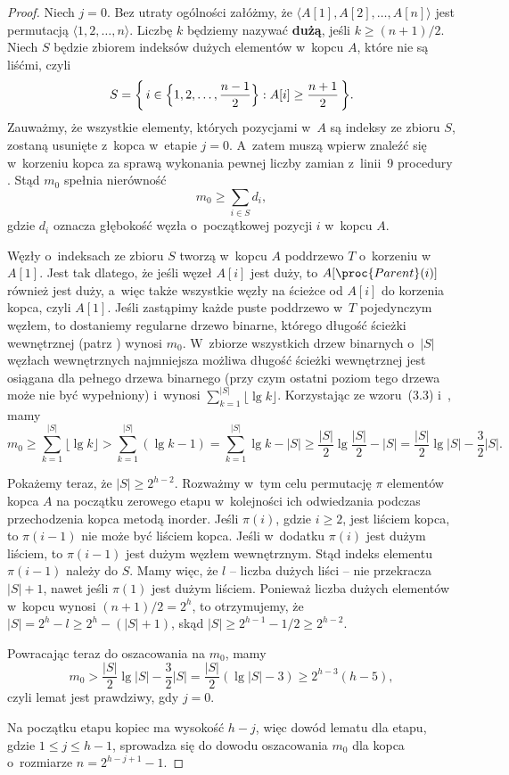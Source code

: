 \begin{proof}
Niech $j=0$. Bez utraty ogólności załóżmy, że $\langle A[1],A[2],\dots,A[n]\rangle$ jest permutacją $\langle1,2,\dots,n\rangle$. Liczbę $k$ będziemy nazywać \textbf{dużą}, jeśli $k\ge(n+1)/2$. Niech $S$ będzie zbiorem indeksów dużych elementów w~kopcu $A$, które nie są liśćmi, czyli
\[
    S = \biggl\{\,i\in\Bigl\{1,2,\dots,\frac{n-1}{2}\Bigr\}:A[i]\ge\frac{n+1}{2}\,\biggr\}.
\]
Zauważmy, że wszystkie elementy, których pozycjami w~$A$ są indeksy ze zbioru $S$, zostaną usunięte z~kopca w~etapie $j=0$. A~zatem muszą wpierw znaleźć się w~korzeniu kopca za sprawą wykonania pewnej liczby zamian z~linii~9 procedury . Stąd $m_0$ spełnia nierówność
\[
    m_0 \ge \sum_{i\in S}d_i,
\]
gdzie $d_i$ oznacza głębokość węzła o~początkowej pozycji $i$ w~kopcu $A$.

Węzły o~indeksach ze zbioru $S$ tworzą w~kopcu $A$ poddrzewo $T$ o~korzeniu w~$A[1]$. Jest tak dlatego, że jeśli węzeł $A[i]$ jest duży, to $A[\proc{Parent}(i)]$ również jest duży, a~więc także wszystkie węzły na ścieżce od $A[i]$ do korzenia kopca, czyli $A[1]$. Jeśli zastąpimy każde puste poddrzewo w~$T$ pojedynczym węzłem, to dostaniemy regularne drzewo binarne, którego długość ścieżki wewnętrznej (patrz ) wynosi $m_0$. W~zbiorze wszystkich drzew binarnych o~$|S|$ węzłach wewnętrznych najmniejsza możliwa długość ścieżki wewnętrznej jest osiągana dla pełnego drzewa binarnego (przy czym ostatni poziom tego drzewa może nie być wypełniony) i~wynosi $\sum_{k=1}^{|S|}\lfloor\lg k\rfloor$. Korzystając ze wzoru~(3.3) i~, mamy
\[
    m_0 \ge \sum_{k=1}^{|S|}\lfloor\lg k\rfloor > \sum_{k=1}^{|S|}(\lg k-1) = \sum_{k=1}^{|S|}\lg k-|S| \ge \frac{|S|}{2}\lg\frac{|S|}{2}-|S| = \frac{|S|}{2}\lg|S|-\frac{3}{2}|S|.
\]

Pokażemy teraz, że $|S|\ge2^{h-2}$. Rozważmy w~tym celu permutację $\pi$ elementów kopca $A$ na początku zerowego etapu w~kolejności ich odwiedzania podczas przechodzenia kopca metodą inorder. Jeśli $\pi(i)$, gdzie $i\ge2$, jest liściem kopca, to $\pi(i-1)$ nie może być liściem kopca. Jeśli w~dodatku $\pi(i)$ jest dużym liściem, to $\pi(i-1)$ jest dużym węzłem wewnętrznym. Stąd indeks elementu $\pi(i-1)$ należy do $S$. Mamy więc, że $l$ -- liczba dużych liści -- nie przekracza $|S|+1$, nawet jeśli $\pi(1)$ jest dużym liściem. Ponieważ liczba dużych elementów w~kopcu wynosi $(n+1)/2=2^h$, to otrzymujemy, że $|S|=2^h-l\ge2^h-(|S|+1)$, skąd $|S|\ge2^{h-1}-1/2\ge2^{h-2}$.

Powracając teraz do oszacowania na $m_0$, mamy
\[
    m_0 > \frac{|S|}{2}\lg|S|-\frac{3}{2}|S| = \frac{|S|}{2}(\lg|S|-3) \ge 2^{h-3}(h-5),
\]
czyli lemat jest prawdziwy, gdy $j=0$.

Na początku  etapu kopiec ma wysokość $h-j$, więc dowód lematu dla  etapu, gdzie $1\le j\le h-1$, sprowadza się do dowodu oszacowania $m_0$ dla kopca o~rozmiarze $n=2^{h-j+1}-1$.
\end{proof}

